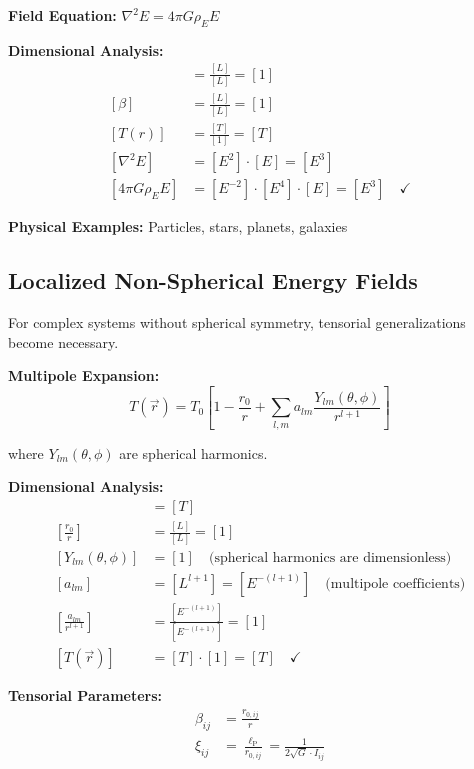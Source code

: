 \documentclass[12pt,a4paper]{report}
\newcommand{\lP}{\ell_{\text{P}}}         %
\begin{document}
	\textbf{Field Equation:} $\nabla^2 E = 4\pi G \rho_E E$
	
	\textbf{Dimensional Analysis:}
	\begin{align}
		[\xi] &= \frac{[L]}{[L]} = [1] \\
		[\beta] &= \frac{[L]}{[L]} = [1] \\
		[T(r)] &= \frac{[T]}{[1]} = [T] \\
		[\nabla^2 E] &= [E^2] \cdot [E] = [E^3] \\
		[4\pi G \rho_E E] &= [E^{-2}] \cdot [E^4] \cdot [E] = [E^3] \quad \checkmark
	\end{align}
	
	\textbf{Physical Examples:} Particles, stars, planets, galaxies
	
	\subsection{Localized Non-Spherical Energy Fields}\label{subsec:localized_nonsphere}
	
	For complex systems without spherical symmetry, tensorial generalizations become necessary.
	
	\textbf{Multipole Expansion:}
	\begin{equation}
		T(\vec{r}) = T_0\left[1 - \frac{r_0}{r} + \sum_{l,m} a_{lm} \frac{Y_{lm}(\theta,\phi)}{r^{l+1}}\right]
		\label{eq:multipole_expansion}
	\end{equation}
	
	where $Y_{lm}(\theta,\phi)$ are spherical harmonics.
	
	\textbf{Dimensional Analysis:}
	\begin{align}
		[T_0] &= [T] \\
		\left[\frac{r_0}{r}\right] &= \frac{[L]}{[L]} = [1] \\
		[Y_{lm}(\theta,\phi)] &= [1] \quad \text{(spherical harmonics are dimensionless)} \\
		[a_{lm}] &= [L^{l+1}] = [E^{-(l+1)}] \quad \text{(multipole coefficients)} \\
		\left[\frac{a_{lm}}{r^{l+1}}\right] &= \frac{[E^{-(l+1)}]}{[E^{-(l+1)}]} = [1] \\
		[T(\vec{r})] &= [T] \cdot [1] = [T] \quad \checkmark
	\end{align}
	
	\textbf{Tensorial Parameters:}
	\begin{align}
		\beta_{ij} &= \frac{r_{0,ij}}{r} \\
		\xi_{ij} &= \frac{\lP}{r_{0,ij}} = \frac{1}{2\sqrt{G} \cdot I_{ij}}
	\end{align}
	
\end{document}
